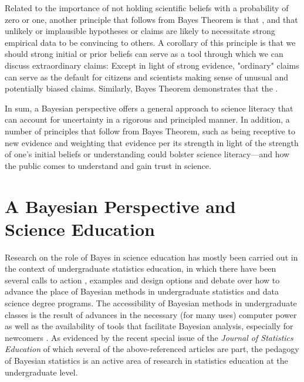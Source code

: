 \documentclass[man]{apa7}
\begin{document}
Related to the importance of not holding scientific beliefs with a probability of zero or one, another principle that follows from Bayes Theorem is that , and that unlikely or implausible hypotheses or claims are likely to necessitate strong empirical data to be convincing to others. A corollary of this principle is that we should strong initial or prior beliefs can serve as a tool through which we can discuss extraordinary claims: Except in light of strong evidence, "ordinary" claims can serve as the default for citizens and scientists making sense of unusual and potentially biased claims. Similarly, Bayes Theorem demonstrates that the . 

In sum, a Bayesian perspective offers a general approach to science literacy that can account for uncertainty in a rigorous and principled manner. In addition, a number of principles that follow from Bayes Theorem, such as being receptive to new evidence and weighting that evidence per its strength in light of the strength of one's initial beliefs or understanding could bolster science literacy---and how the public comes to understand and gain trust in science.

\section{A Bayesian Perspective and Science Education}

Research on the role of Bayes in science education has mostly been carried out in the context of undergraduate statistics education, in which there have been several calls to action \parencite{gpkpwc18, h_a20}, examples and design options \parencite{a02, b02,g08, w17, h_j20} and debate \parencite{jrhrr20} over how to advance the place of Bayesian methods in undergraduate statistics and data science degree programs. The accessibility of Bayesian methods in undergraduate classes is the result of advances in the necessary (for many uses) computer power \parencite{gpkpwc18} as well as the availability of tools that facilitate Bayesian analysis, especially for newcomers \parencite{ah20}. As evidenced by the recent special issue of the \emph{Journal of Statistics Education} of which several of the above-referenced articles are part, the pedagogy of Bayesian statistics is an active area of research in statistics education at the undergraduate level.
\end{document}

